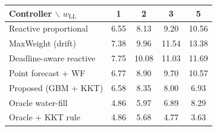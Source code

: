 \begin{tabular}{lcccc}
\hline
Controller $\backslash$ $w_{\mathrm{LL}}$ & 1 & 2 & 3 & 5 \\
\hline
Reactive proportional & 6.55 & 8.13 & 9.20 & 10.56 \\
MaxWeight (drift) & 7.38 & 9.96 & 11.54 & 13.38 \\
Deadline-aware reactive & 7.75 & 10.08 & 11.03 & 11.69 \\
Point forecast + WF & 6.77 & 8.90 & 9.70 & 10.57 \\
Proposed (GBM + KKT) & 6.58 & 8.35 & 8.00 & 6.93 \\
\hline
Oracle water-fill & 4.86 & 5.97 & 6.89 & 8.29 \\
Oracle + KKT rule & 4.86 & 5.68 & 4.77 & 3.63 \\
\hline
\end{tabular}
